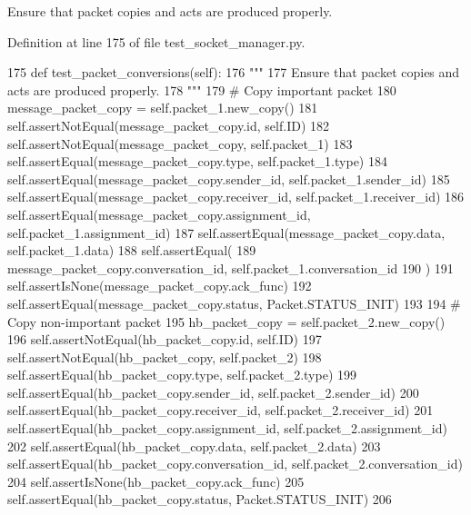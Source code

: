 \begin{DoxyVerb}Ensure that packet copies and acts are produced properly.
\end{DoxyVerb}
 

Definition at line 175 of file test\+\_\+socket\+\_\+manager.\+py.


\begin{DoxyCode}
175     \textcolor{keyword}{def }test\_packet\_conversions(self):
176         \textcolor{stringliteral}{"""}
177 \textcolor{stringliteral}{        Ensure that packet copies and acts are produced properly.}
178 \textcolor{stringliteral}{        """}
179         \textcolor{comment}{# Copy important packet}
180         message\_packet\_copy = self.packet\_1.new\_copy()
181         self.assertNotEqual(message\_packet\_copy.id, self.ID)
182         self.assertNotEqual(message\_packet\_copy, self.packet\_1)
183         self.assertEqual(message\_packet\_copy.type, self.packet\_1.type)
184         self.assertEqual(message\_packet\_copy.sender\_id, self.packet\_1.sender\_id)
185         self.assertEqual(message\_packet\_copy.receiver\_id, self.packet\_1.receiver\_id)
186         self.assertEqual(message\_packet\_copy.assignment\_id, self.packet\_1.assignment\_id)
187         self.assertEqual(message\_packet\_copy.data, self.packet\_1.data)
188         self.assertEqual(
189             message\_packet\_copy.conversation\_id, self.packet\_1.conversation\_id
190         )
191         self.assertIsNone(message\_packet\_copy.ack\_func)
192         self.assertEqual(message\_packet\_copy.status, Packet.STATUS\_INIT)
193 
194         \textcolor{comment}{# Copy non-important packet}
195         hb\_packet\_copy = self.packet\_2.new\_copy()
196         self.assertNotEqual(hb\_packet\_copy.id, self.ID)
197         self.assertNotEqual(hb\_packet\_copy, self.packet\_2)
198         self.assertEqual(hb\_packet\_copy.type, self.packet\_2.type)
199         self.assertEqual(hb\_packet\_copy.sender\_id, self.packet\_2.sender\_id)
200         self.assertEqual(hb\_packet\_copy.receiver\_id, self.packet\_2.receiver\_id)
201         self.assertEqual(hb\_packet\_copy.assignment\_id, self.packet\_2.assignment\_id)
202         self.assertEqual(hb\_packet\_copy.data, self.packet\_2.data)
203         self.assertEqual(hb\_packet\_copy.conversation\_id, self.packet\_2.conversation\_id)
204         self.assertIsNone(hb\_packet\_copy.ack\_func)
205         self.assertEqual(hb\_packet\_copy.status, Packet.STATUS\_INIT)
206 
\end{DoxyCode}
\mbox{\label{classparlai_1_1mturk_1_1core_1_1dev_1_1test_1_1test__socket__manager_1_1TestPacket_a3e63756c8bec34bf7935912449e88cbd}} 
